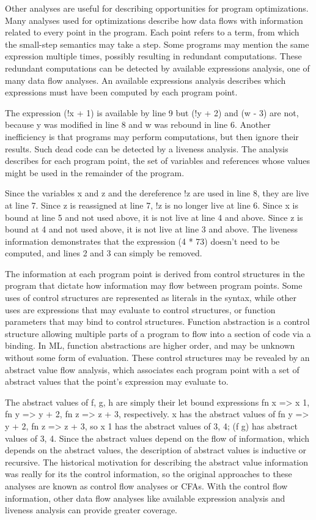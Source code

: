 \documentclass{article}
\begin{document}
Other analyses are useful for describing opportunities for program optimizations.  Many
analyses used for optimizations describe how data flows with information related to every point
in the program.  Each point refers to a term, from which the small-step semantics may take a
step.  Some programs may mention the same expression multiple times, possibly resulting in
redundant computations.  These redundant computations can be detected by available expressions
analysis, one of many data flow analyses.  An available expressions analysis describes which
expressions must have been computed by each program point.

The expression (!x + 1) is available by line 9 but (!y + 2) and (w - 3) are not, because y was
modified in line 8 and w was rebound in line 6. Another inefficiency is that programs may
perform computations, but then ignore their results.  Such dead code can be detected by a
liveness analysis.  The analysis describes for each program point, the set of variables and
references whose values might be used in the remainder of the program.

Since the variables x and z and the dereference !z are used in line 8, they are live at line
7.  Since z is reassigned at line 7, !z is no longer live at line 6.  Since x is bound at line
5 and not used above, it is not live at line 4 and above.  Since z is bound at 4 and not used
above, it is not live at line 3 and above. The liveness information demonstrates that the
expression (4 * 73) doesn't need to be computed, and lines 2 and 3 can simply be removed.

The information at each program point is derived from control structures in the program that
dictate how information may flow between program points.  Some uses of control structures are
represented as literals in the syntax, while other uses are expressions that may evaluate to
control structures, or function parameters that may bind to control structures.  Function
abstraction is a control structure allowing multiple parts of a program to flow into a section
of code via a binding.  In ML, function abstractions are higher order, and may be unknown
without some form of evaluation.  These control structures may be revealed by an abstract value
flow analysis, which associates each program point with a set of abstract values that the
point's expression may evaluate to.


The abstract values of f, g, h are simply their let bound expressions {fn x => x 1},
{fn y => y + 2},  {fn z => z + 3}, respectively.  x has the abstract values of
{fn y => y + 2, fn z => z + 3}, so x 1 has the abstract values of {3, 4}; (f g) has abstract
values of {3, 4}.  Since the abstract values depend on the flow of information, which depends
on the abstract values, the description of abstract values is inductive or recursive.  The
historical motivation for describing the abstract value information was really for its the
control information, so the original approaches to these analyses are known as control flow
analyses or CFAs.  With the control flow information, other data flow analyses like available
expression analysis and liveness analysis can provide greater coverage.
\end{document}
